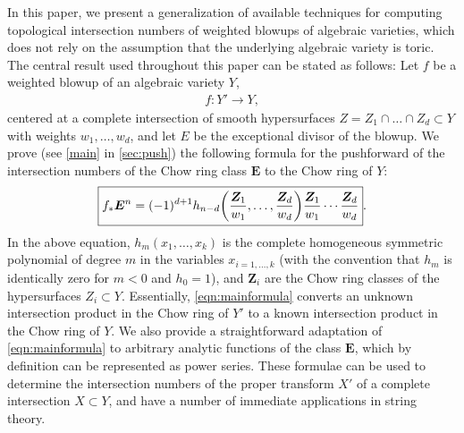 \documentclass[11pt,oneside,english]{article}
\numberwithin{equation}{section}
\let\originalleft\left
\let\originalright\right
\renewcommand*{\left}{\mathopen{}\mathclose\bgroup\originalleft}
\renewcommand*{\right}{\aftergroup\egroup\originalright}
\theoremstyle{definition}
\begin{document}
In this paper, we present a generalization of available techniques for computing topological intersection numbers of weighted blowups of algebraic varieties, which does not rely on the assumption that the underlying algebraic variety is toric. The central result used throughout this paper can be stated as follows: Let $f$ be a weighted blowup of an algebraic variety $Y$,
	\begin{align}
		f: Y' \rightarrow Y,
	\end{align}
 centered at a complete intersection of smooth hypersurfaces $Z = Z_1 \cap \dots \cap Z_d \subset Y $ with weights $w_1, \dots, w_d$, and let $E$ be the exceptional divisor of the blowup. We prove (see \cref{main} in \cref{sec:push}) the following formula for the pushforward of the intersection numbers of the Chow ring class $\boldsymbol E$ to the Chow ring of $Y$:
 	\begin{align}
	\label{eqn:mainformula}
\boxed{f_* \boldsymbol E^n = (-1)^{d+1} h_{n-d} \left( \frac{\boldsymbol Z_1}{w_1}, \dots, \frac{\boldsymbol Z_d}{w_d}\right)  \frac{\boldsymbol Z_1}{w_1} \cdots \frac{\boldsymbol Z_d}{w_d}}.
	\end{align}
In the above equation, $h_m(x_1,\dots,x_k)$ is the complete homogeneous symmetric polynomial of degree $m$ in the variables $x_{i=1,\dots,k}$ (with the convention that $h_m$ is identically zero for $m<0$ and $h_0 =1$), and $\boldsymbol Z_i$ are the Chow ring classes of the hypersurfaces $Z_i \subset Y$. Essentially, \cref{eqn:mainformula} converts an unknown intersection product in the Chow ring of $Y'$ to a known intersection product in the Chow ring of $Y$. We also provide a straightforward adaptation of \cref{eqn:mainformula} to arbitrary analytic functions of the class $\boldsymbol E$, which by definition can be represented as power series. These formulae can be used to determine the intersection numbers of the proper transform $X'$ of a complete intersection $X \subset Y$, and have a number of immediate applications in string theory.
\end{document}
